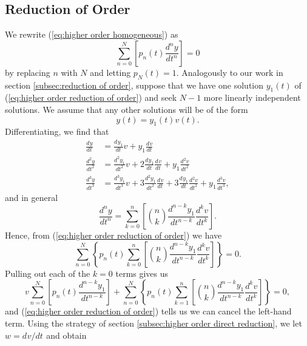 \documentclass{myart}
\newcommand{\eq}[1]{(\ref{eq:#1})}
\newcommand{\deriv}[3][]{\frac{d^{#1}#2}{d#3^{#1}}}
\newcommand{\fderiv}[3][]{d^{#1}#2/d#3^{#1}}
\begin{document}
\subsection{Reduction of Order}
\label{subsec:higher order reduction of order}

We rewrite \eq{higher order homogeneous} as
\begin{equation} \label{eq:higher order reduction of order}
  \sum_{n=0}^N \left[p_n(t) \deriv[n]{y}{t}\right] = 0
\end{equation}
by replacing $n$ with $N$ and letting $p_N(t) = 1$. Analogously to our
work in section \ref{subsec:reduction of order}, suppose that we have
one solution $y_1(t)$ of \eq{higher order reduction of order} and seek
$N - 1$ more linearly independent solutions. We assume that any other
solutions will be of the form
\begin{equation*}
  y(t) = y_1(t)v(t).
\end{equation*}
Differentiating, we find that
\begin{align*}
     \deriv{y}{t}
  &= \deriv{y_1}{t} v + y_1 \deriv{v}{t} \\
     \deriv[2]{y}{t}
  &=       \deriv[2]{y_1}{t} v
     + 2   \deriv   {y_1}{t} \deriv{v}{t}
     + y_1 \deriv[2]{v  }{t} \\
     \deriv[3]{y}{t}
  &=     \deriv[3]{y_1}{t} v
     + 3 \deriv[2]{y_1}{t} \deriv   {v}{t}
     + 3 \deriv   {y_1}{t} \deriv[2]{v}{t}
     +             y_1     \deriv[3]{v}{t},
\end{align*}
and in general
\begin{equation*}
    \deriv[n]{y}{t}
  = \sum_{k=0}^n \left[
      \binom{n}{k} \deriv[n-k]{y_1}{t} \deriv[k]{v}{t}
    \right].
\end{equation*}
Hence, from \eq{higher order reduction of order} we have
\begin{equation*}
  \sum_{n=0}^N \left\{p_n(t) \sum_{k=0}^n \left[
    \binom{n}{k} \deriv[n-k]{y_1}{t} \deriv[k]{v}{t}
  \right]\right\} = 0.
\end{equation*}
Pulling out each of the $k = 0$ terms gives us
\begin{equation*}
    v \sum_{n=0}^N \left [p_n(t) \deriv[n-k]{y_1}{t}\right]
  +   \sum_{n=0}^N \left\{p_n(t) \sum_{k=1}^n \left[
        \binom{n}{k} \deriv[n-k]{y_1}{t} \deriv[k]{v}{t}
      \right]\right\} = 0,
\end{equation*}
and \eq{higher order reduction of order} tells us we can cancel the
left-hand term. Using the strategy of section \ref{subsec:higher order
  direct reduction}, we let $w = \fderiv{v}{t}$ and obtain
\end{document}
